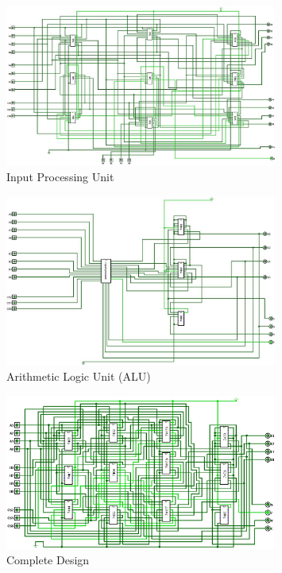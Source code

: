 \documentclass[11pt]{article}
\begin{document}
     \begin{figure}[H]
         \centering
         \includegraphics[width=0.8\textwidth]{images/pic1.jpg}
         \caption{Input Processing Unit}
         \label{fig:alu_a}
     \end{figure}
     \begin{figure}[H]
         \centering
         \includegraphics[width=0.8\textwidth]{images/pic2.jpg}
         \caption{Arithmetic Logic Unit (ALU)}
         \label{fig:alu_b}
     \end{figure}
     \begin{figure}[H]
         \centering
         \includegraphics[width=0.8\textwidth]{images/pic3.png}
         \caption{Complete Design}
         \label{fig:alu_c}
     \end{figure}
\end{document}
